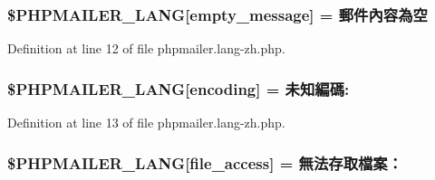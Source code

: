 \subsubsection[{\texorpdfstring{\$\+P\+H\+P\+M\+A\+I\+L\+E\+R\+\_\+\+L\+A\+NG}{$PHPMAILER_LANG}}]{\setlength{\rightskip}{0pt plus 5cm}\$P\+H\+P\+M\+A\+I\+L\+E\+R\+\_\+\+L\+A\+NG\mbox{[}\textquotesingle{}empty\+\_\+message\textquotesingle{}\mbox{]} = \textquotesingle{}郵件內容為空\textquotesingle{}}\hypertarget{phpmailer_8lang-zh_8php_a33772099f637c9d6c2cd7425e0e37fed}{}\label{phpmailer_8lang-zh_8php_a33772099f637c9d6c2cd7425e0e37fed}


Definition at line 12 of file phpmailer.\+lang-\/zh.\+php.

\subsubsection[{\texorpdfstring{\$\+P\+H\+P\+M\+A\+I\+L\+E\+R\+\_\+\+L\+A\+NG}{$PHPMAILER_LANG}}]{\setlength{\rightskip}{0pt plus 5cm}\$P\+H\+P\+M\+A\+I\+L\+E\+R\+\_\+\+L\+A\+NG\mbox{[}\textquotesingle{}encoding\textquotesingle{}\mbox{]} = \textquotesingle{}未知編碼\+: \textquotesingle{}}\hypertarget{phpmailer_8lang-zh_8php_a817f7283f3d54c970a0c10305cc668cc}{}\label{phpmailer_8lang-zh_8php_a817f7283f3d54c970a0c10305cc668cc}


Definition at line 13 of file phpmailer.\+lang-\/zh.\+php.

\subsubsection[{\texorpdfstring{\$\+P\+H\+P\+M\+A\+I\+L\+E\+R\+\_\+\+L\+A\+NG}{$PHPMAILER_LANG}}]{\setlength{\rightskip}{0pt plus 5cm}\$P\+H\+P\+M\+A\+I\+L\+E\+R\+\_\+\+L\+A\+NG\mbox{[}\textquotesingle{}file\+\_\+access\textquotesingle{}\mbox{]} = \textquotesingle{}無法存取檔案：\textquotesingle{}}\hypertarget{phpmailer_8lang-zh_8php_a7e83349023b856ef9e5c46e30ae6d51e}{}\label{phpmailer_8lang-zh_8php_a7e83349023b856ef9e5c46e30ae6d51e}


